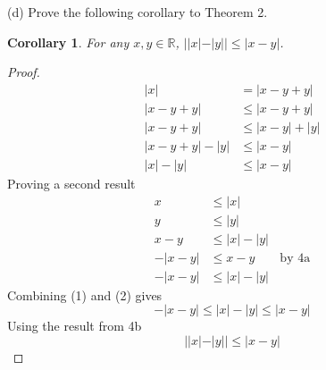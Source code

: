 \documentclass[12pt]{article}
\newtheorem{corollary}{Corollary}[theorem1]
\begin{document}
\begin{enumerate}
			(d) Prove the following corollary to Theorem 2.
			\begin{corollary}
				For any $x,y\in \mathbb{R}$, $||x|-|y||\leq |x-y|$.
			\end{corollary}
			\begin{proof}
				\begin{align}
					|x|&=|x-y+y|\nonumber \\
					|x-y+y|&\leq |x-y+y|\nonumber \\
					|x-y+y|&\leq |x-y|+|y|\nonumber \\
					|x-y+y|-|y|&\leq |x-y|\nonumber \\
					|x|-|y|&\leq |x-y|
				\end{align}
				Proving a second result
				\begin{align}
					x&\leq |x|\nonumber\\
					y&\leq |y|\nonumber\\
					x-y&\leq |x|-|y|\nonumber\\
					-|x-y|&\leq x-y\qquad \text{by 4a}\nonumber\\
					-|x-y|&\leq |x|-|y|
				\end{align}
				 Combining (1) and (2) gives
				 \[
				 	-|x-y|\leq |x|-|y|\leq |x-y|
				 \]
				 Using the result from 4b
				 \[
				 	||x|-|y||\leq |x-y|
				 \]
			\end{proof}
	

	\end{enumerate}

	
\end{document}
